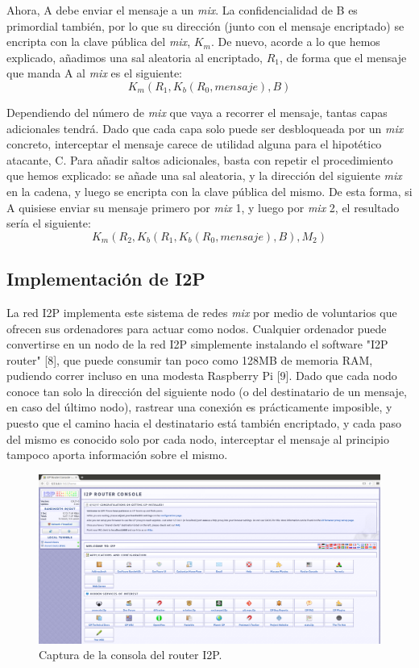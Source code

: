 \documentclass{article}
\begin{document}
Ahora, A debe enviar el mensaje a un \textit{mix}. La confidencialidad de B es primordial también, por lo que su dirección (junto con el mensaje encriptado) se encripta con la clave pública del \textit{mix},
\(K_m\). De nuevo, acorde a lo que hemos explicado, añadimos una sal aleatoria al encriptado, \(R_1\), de forma que el mensaje que manda A al \textit{mix} es el siguiente: \[K_m(R_1, K_b(R_0, mensaje), B)\]

Dependiendo del número de \textit{mix} que vaya a recorrer el mensaje, tantas capas adicionales tendrá. Dado que cada capa solo puede ser desbloqueada por un \textit{mix} concreto, interceptar
el mensaje carece de utilidad alguna para el hipotético atacante, C. Para añadir saltos adicionales, basta con repetir el procedimiento que hemos explicado: se añade una sal aleatoria, y la dirección
del siguiente \textit{mix} en la cadena, y luego se encripta con la clave pública del mismo. De esta forma, si A quisiese enviar su mensaje primero por \textit{mix} 1, y luego por \textit{mix} 2,
el resultado sería el siguiente: \[K_m(R_2, K_b(R_1, K_b(R_0, mensaje), B), M_2)\]

\subsection{Implementación de I2P}

La red I2P implementa este sistema de redes \textit{mix} por medio de voluntarios que ofrecen sus ordenadores para actuar como nodos. Cualquier ordenador puede convertirse en un nodo de la red
I2P simplemente instalando el software "I2P router" [8], que puede consumir tan poco como 128MB de memoria RAM, pudiendo correr incluso en una modesta Raspberry Pi [9].
Dado que cada nodo conoce tan solo la dirección del siguiente nodo (o del destinatario de un mensaje, en caso del último nodo), rastrear una conexión es prácticamente imposible, y puesto que el camino
hacia el destinatario está también encriptado, y cada paso del mismo es conocido solo por cada nodo, interceptar el mensaje al principio tampoco aporta información sobre el mismo.

\begin{figure}[H]
    \centering
    \includegraphics[width=\linewidth]{media/I2P Router Console.png}
    \caption{Captura de la consola del router I2P.}
    \label{fig2}
\end{figure}
\end{document}
